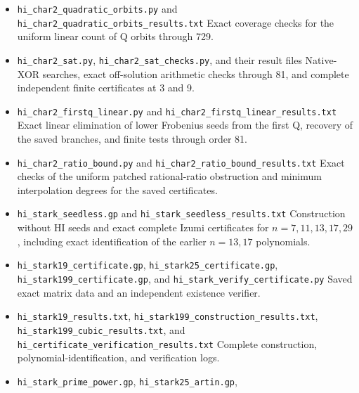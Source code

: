 \documentclass[11pt,reqno]{amsart}
\theoremstyle{plain}
\begin{document}
\begin{itemize}
phase-algebra lengths at every odd order through 13.
\item \texttt{hi\_\allowbreak char2\_\allowbreak quadratic\_\allowbreak orbits.py} and \texttt{hi\_\allowbreak char2\_\allowbreak quadratic\_\allowbreak orbits\_\allowbreak results.txt}
Exact coverage checks for the uniform linear count of Q orbits through 729.
\item \texttt{hi\_\allowbreak char2\_\allowbreak sat.py}, \texttt{hi\_\allowbreak char2\_\allowbreak sat\_\allowbreak checks.py}, and their result files
Native-XOR searches, exact off-solution arithmetic checks through 81,
and complete independent finite certificates at 3 and 9.
\item \texttt{hi\_\allowbreak char2\_\allowbreak firstq\_\allowbreak linear.py} and \texttt{hi\_\allowbreak char2\_\allowbreak firstq\_\allowbreak linear\_\allowbreak results.txt}
Exact linear elimination of lower Frobenius seeds from the first Q,
recovery of the saved branches, and finite tests through order 81.
\item \texttt{hi\_\allowbreak char2\_\allowbreak ratio\_\allowbreak bound.py} and \texttt{hi\_\allowbreak char2\_\allowbreak ratio\_\allowbreak bound\_\allowbreak results.txt}
Exact checks of the uniform patched rational-ratio obstruction and
minimum interpolation degrees for the saved certificates.
\item \texttt{hi\_\allowbreak stark\_\allowbreak seedless.gp} and \texttt{hi\_\allowbreak stark\_\allowbreak seedless\_\allowbreak results.txt}
Construction without HI seeds and exact complete Izumi certificates
for \(n=7,11,13,17,29\), including exact identification of the earlier
\(n=13,17\) polynomials.
\item \texttt{hi\_\allowbreak stark19\_\allowbreak certificate.gp}, \texttt{hi\_\allowbreak stark25\_\allowbreak certificate.gp},
\texttt{hi\_\allowbreak stark199\_\allowbreak certificate.gp}, and
\texttt{hi\_\allowbreak stark\_\allowbreak verify\_\allowbreak certificate.py}
Saved exact matrix data and an independent existence verifier.
\item \texttt{hi\_\allowbreak stark19\_\allowbreak results.txt}, \texttt{hi\_\allowbreak stark199\_\allowbreak construction\_\allowbreak results.txt},
\texttt{hi\_\allowbreak stark199\_\allowbreak cubic\_\allowbreak results.txt}, and \texttt{hi\_\allowbreak certificate\_\allowbreak verification\_\allowbreak results.txt}
Complete construction, polynomial-identification, and verification logs.
\item \texttt{hi\_\allowbreak stark\_\allowbreak prime\_\allowbreak power.gp}, \texttt{hi\_\allowbreak stark25\_\allowbreak artin.gp},

\end{itemize}
\end{document}
